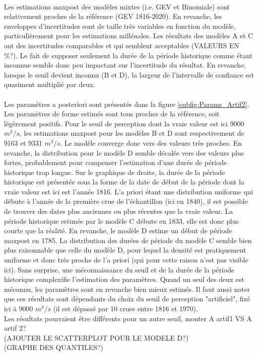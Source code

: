 \documentclass[11pt]{article}
\begin{document}
	\paragraph{} Les estimations maxpost des modèles mixtes (i.e. GEV et Binomiale) sont relativement proches de la référence (GEV 1816-2020). En revanche, les enveloppes d'incertitudes sont de taille très variables en fonction du modèle, particulièrement pour les estimations millénales. Les résultats des modèles A et C ont des incertitudes comparables et qui semblent acceptables (VALEURS EN \%?). Le fait de supposer seulement la durée de la période historique comme étant inconnue semble donc peu impactant sur l'incertitude du résultat. En revanche, lorsque le seuil devient inconnu (B et D), la largeur de l'intervalle de confiance est quasiment multiplié par deux. 
	\paragraph{} Les paramètres a posteriori sont présentés dans la figure \ref{subfig:Params_Artif2}. Les paramètres de forme estimés sont tous proches de la référence, soit légèrement positifs. Pour le seuil de perception dont la vraie valeur est ici 9000 $m^3/s$, les estimations maxpost pour les modèles B et D sont respectivement de 9163 et 9331 $m^3/s$. Le modèle converge donc vers des valeurs très proches. En revanche, la distribution pour le modèle D semble décalée vers des valeurs plus fortes, probablement pour compenser l'estimation d'une durée de période historique trop longue. Sur le graphique de droite, la durée de la période historique est présentée sous la forme de la date de début de la période dont la vraie valeur est ici est l'année 1816. L'a  priori étant une distribution uniforme qui débute à l'année de la première crue de l'échantillon (ici en 1840), il est possible de trouver des dates plus anciennes ou plus récentes que la vraie valeur. La période historique estimée par le modèle C débute en 1833, elle est donc plus courte que la réalité. En revanche, le modèle D estime un début de période maxpost en 1785. La distribution des durées de période du modèle C semble bien plus raisonnable que celle du modèle D, pour lequel la densité est pratiquement uniforme et donc très proche de l'a priori (qui pour cette raison n'est pas visible ici). Sans surprise, une méconnaissance du seuil et de la durée de la période historique complexifie l'estimation des paramètres. Quand un seul des deux est méconnu, les paramètres sont en revanche bien mieux estimés. Il faut aussi noter que ces résultats sont dépendants du choix du seuil de perception "artificiel", fixé ici à 9000 $m^3/s$ (il est dépassé par 10 crues entre 1816 et 1970).
	\\
	Les résultats pourraient être différents pour un autre seuil, monter A artif1 VS A artif 2? \\
	(AJOUTER LE SCATTERPLOT POUR LE MODELE D?)\\
	(GRAPHE DES QUANTILES?)\\
	
\end{document}
